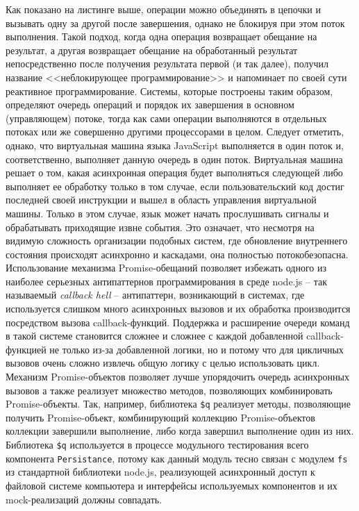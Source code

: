 Как показано на листинге выше, операции можно объединять в цепочки и вызывать одну за другой после завершения, однако не блокируя при этом поток выполнения. Такой подход,
когда одна операция возвращает обещание на результат, а другая возвращает обещание на обработанный результат непосредственно после получения результата первой (и так далее),
получил название <<неблокирующее программирование>> и напоминает по своей сути реактивное программирование. Системы\cite{cite_webpage}\cite{connection}, которые построены таким образом, определяют очередь
операций и порядок их завершения в основном (управляющем) потоке, тогда как сами операции выполняются в отдельных потоках или же совершенно другими процессорами в целом.
Следует отметить, однако, что виртуальная машина языка JavaScript выполняется в один поток и, соответственно, выполняет данную очередь в один поток. Виртуальная машина
решает о том, какая асинхронная операция будет выполняться следующей либо выполняет ее обработку только в том случае, если пользовательский код достиг последней своей
инструкции и вышел в область управления виртуальной машины. Только в этом случае, язык может начать прослушивать сигналы и обрабатывать приходящие извне события. Это
означает, что несмотря на видимую сложность организации подобных систем, где обновление внутреннего состояния происходят асинхронно и каскадами, она полностью
потокобезопасна.
Использование механизма Promise-обещаний позволяет избежать одного из наиболее серьезных антипаттернов программирования в среде node.js -- так
называемый \textit{callback hell} -- антипаттерн, возникающий в системах, где используется слишком много асинхронных вызовов и их обработка производится
посредством вызова callback-функций. Поддержка и расширение очереди команд в такой системе становится сложнее и сложнее с каждой добавленной callback-функцией 
не только из-за добавленной логики, но и потому что для цикличных вызовов очень сложно извлечь общую логику с целью использовать цикл. Механизм Promise-объектов
позволяет лучше упорядочить очередь асинхронных вызовов а также реализует множество методов, позволяющих комбинировать Promise-объекты. Так, например,
библиотека \texttt{\$q} реализует методы, позволяющие получить Promise-объект, комбинирующий коллекцию Promise-объектов коллекции завершили выполнение, либо когда
завершил выполнение один из них. Библиотека \texttt{\$q} используется в процессе модульного тестирования всего компонента \texttt{Persistance}, потому как данный модуль
тесно связан с модулем \texttt{fs} из стандартной библиотеки node.js, реализующей асинхронный доступ к файловой системе компьютера и интерфейсы используемых компонентов
и их mock-реализаций должны совпадать.

